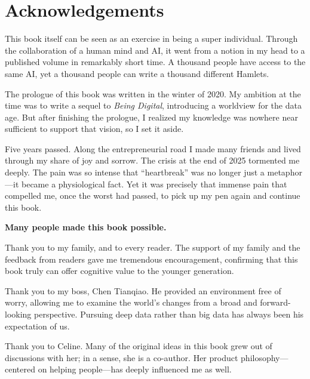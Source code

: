 \newpage
\section{Acknowledgements}
This book itself can be seen as an exercise in being a super individual. Through the collaboration of a human mind and AI, it went from a notion in my head to a published volume in remarkably short time. A thousand people have access to the same AI, yet a thousand people can write a thousand different Hamlets.
\vspace{1em}

The prologue of this book was written in the winter of 2020. My ambition at the time was to write a sequel to \emph{Being Digital}, introducing a worldview for the data age. But after finishing the prologue, I realized my knowledge was nowhere near sufficient to support that vision, so I set it aside.

\vspace{1em}

Five years passed. Along the entrepreneurial road I made many friends and lived through my share of joy and sorrow.
The crisis at the end of 2025 tormented me deeply. The pain was so intense that ``heartbreak'' was no longer just a metaphor---it became a physiological fact. Yet it was precisely that immense pain that compelled me, once the worst had passed, to pick up my pen again and continue this book.

\vspace{1em}

\textbf{Many people made this book possible.}

Thank you to my family, and to every reader. The support of my family and the feedback from readers gave me tremendous encouragement, confirming that this book truly can offer cognitive value to the younger generation.

\vspace{1em}

Thank you to my boss, Chen Tianqiao. He provided an environment free of worry, allowing me to examine the world's changes from a broad and forward-looking perspective. Pursuing deep data rather than big data has always been his expectation of us.
\vspace{1em}

Thank you to Celine. Many of the original ideas in this book grew out of discussions with her;
in a sense, she is a co-author.
Her product philosophy---centered on helping people---has deeply influenced me as well.

